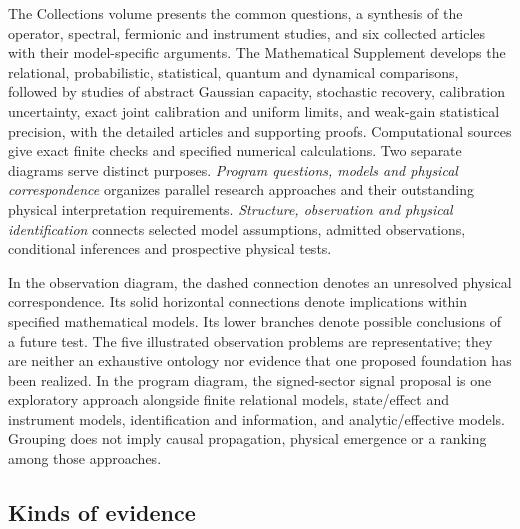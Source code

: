 The Collections volume presents the common questions, a synthesis of the operator, spectral, fermionic and instrument studies, and six collected articles with their model-specific arguments. The Mathematical Supplement develops the relational, probabilistic, statistical, quantum and dynamical comparisons, followed by studies of abstract Gaussian capacity, stochastic recovery, calibration uncertainty, exact joint calibration and uniform limits, and weak-gain statistical precision, with the detailed articles and supporting proofs. Computational sources give exact finite checks and specified numerical calculations. Two separate diagrams serve distinct purposes. \emph{Program questions, models and physical correspondence} organizes parallel research approaches and their outstanding physical interpretation requirements. \emph{Structure, observation and physical identification} connects selected model assumptions, admitted observations, conditional inferences and prospective physical tests.

In the observation diagram, the dashed connection denotes an unresolved physical correspondence. Its solid horizontal connections denote implications within specified mathematical models. Its lower branches denote possible conclusions of a future test. The five illustrated observation problems are representative; they are neither an exhaustive ontology nor evidence that one proposed foundation has been realized. In the program diagram, the signed-sector signal proposal is one exploratory approach alongside finite relational models, state/effect and instrument models, identification and information, and analytic/effective models. Grouping does not imply causal propagation, physical emergence or a ranking among those approaches.

\subsection{Kinds of evidence}


